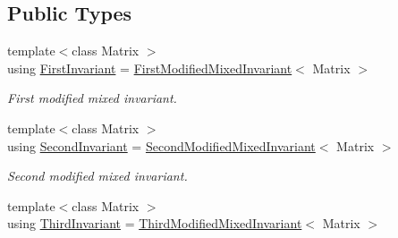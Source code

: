 \subsection*{Public Types}
\begin{DoxyCompactItemize}
\item 
\hypertarget{structRFFGen_1_1LinearAlgebra_1_1InvariantTraits_3_01Invariant_1_1MODIFIED__MIXED_01_4_a2e9c77811a907230ca6928e47f40e2d8}{{\footnotesize template$<$class Matrix $>$ }\\using \hyperlink{structRFFGen_1_1LinearAlgebra_1_1InvariantTraits_3_01Invariant_1_1MODIFIED__MIXED_01_4_a2e9c77811a907230ca6928e47f40e2d8}{First\-Invariant} = \hyperlink{structRFFGen_1_1LinearAlgebra_1_1FirstModifiedMixedInvariant}{First\-Modified\-Mixed\-Invariant}$<$ Matrix $>$}\label{structRFFGen_1_1LinearAlgebra_1_1InvariantTraits_3_01Invariant_1_1MODIFIED__MIXED_01_4_a2e9c77811a907230ca6928e47f40e2d8}

\begin{DoxyCompactList}\small\item\em First modified mixed invariant. \end{DoxyCompactList}\item 
\hypertarget{structRFFGen_1_1LinearAlgebra_1_1InvariantTraits_3_01Invariant_1_1MODIFIED__MIXED_01_4_aba7f0f9706ccef6643ea5d9a9e98a217}{{\footnotesize template$<$class Matrix $>$ }\\using \hyperlink{structRFFGen_1_1LinearAlgebra_1_1InvariantTraits_3_01Invariant_1_1MODIFIED__MIXED_01_4_aba7f0f9706ccef6643ea5d9a9e98a217}{Second\-Invariant} = \hyperlink{structRFFGen_1_1LinearAlgebra_1_1SecondModifiedMixedInvariant}{Second\-Modified\-Mixed\-Invariant}$<$ Matrix $>$}\label{structRFFGen_1_1LinearAlgebra_1_1InvariantTraits_3_01Invariant_1_1MODIFIED__MIXED_01_4_aba7f0f9706ccef6643ea5d9a9e98a217}

\begin{DoxyCompactList}\small\item\em Second modified mixed invariant. \end{DoxyCompactList}\item 
\hypertarget{structRFFGen_1_1LinearAlgebra_1_1InvariantTraits_3_01Invariant_1_1MODIFIED__MIXED_01_4_af4f54af809f3035773fdb89c04a20f9f}{{\footnotesize template$<$class Matrix $>$ }\\using \hyperlink{structRFFGen_1_1LinearAlgebra_1_1InvariantTraits_3_01Invariant_1_1MODIFIED__MIXED_01_4_af4f54af809f3035773fdb89c04a20f9f}{Third\-Invariant} = \hyperlink{structRFFGen_1_1LinearAlgebra_1_1ThirdModifiedMixedInvariant}{Third\-Modified\-Mixed\-Invariant}$<$ Matrix $>$}\label{structRFFGen_1_1LinearAlgebra_1_1InvariantTraits_3_01Invariant_1_1MODIFIED__MIXED_01_4_af4f54af809f3035773fdb89c04a20f9f}


\end{DoxyCompactItemize}
